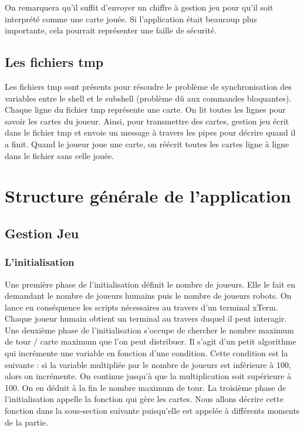 \documentclass{article}
\begin{document}
\begin{itemize}
On remarquera qu'il suffit d'envoyer un chiffre à gestion jeu pour qu'il soit interprété comme une carte jouée. Si l'application était beaucoup plus importante, cela pourrait représenter une faille de sécurité. 
  
\end{itemize}

\newpage
\subsection{Les fichiers tmp}
Les fichiers tmp sont présents pour résoudre le problème de synchronisation des variables entre le shell et le subshell (problème dû aux commandes bloquantes). Chaque ligne du fichier tmp représente une carte. On lit toutes les lignes pour savoir les cartes du joueur. Ainsi, pour transmettre des cartes, gestion jeu écrit dans le fichier tmp et envoie un message à travers les pipes pour décrire quand il a finit. Quand le joueur joue une carte, on réécrit toutes les cartes ligne à ligne dans le fichier sans celle jouée.


\section{Structure générale de l'application}

\subsection{Gestion Jeu}
\subsubsection{L'initialisation}

Une première phase de l'initialisation définit le nombre de joueurs. Elle le fait en demandant le nombre de joueurs humains puis le nombre de joueurs robots. On lance en conséquence les scripts nécessaires au travers d'un terminal xTerm. Chaque joueur humain obtient un terminal au travers duquel il peut interagir.
\newline
\newline
Une deuxième phase de l'initialisation s'occupe de chercher le nombre maximum de tour / carte maximum que l'on peut distribuer. Il s'agit d'un petit algorithme qui incrémente une variable en fonction d'une condition. Cette condition est la suivante : si la variable multipliée par le nombre de joueurs est inférieure à 100, alors on incrémente. On continue jusqu'à que la multiplication soit supérieure à 100. On en déduit à la fin le nombre maximum de tour.
\newline
\newline
La troisième phase de l'initialisation appelle la fonction qui gère les cartes. Nous allons décrire cette fonction dans la sous-section suivante puisqu'elle est appelée à différents moments de la partie.  
\end{document}
